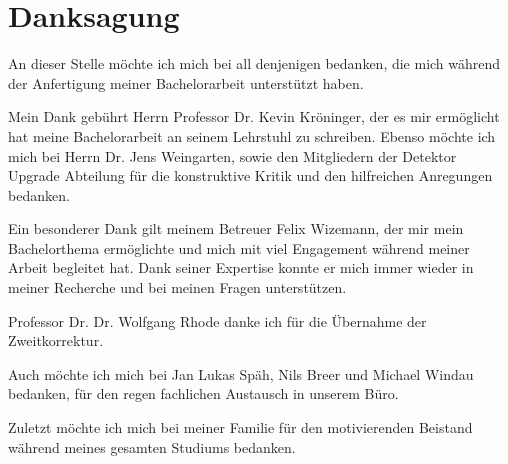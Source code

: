 \thispagestyle{empty}
\section*{Danksagung}

An dieser Stelle möchte ich mich bei all denjenigen bedanken, die mich während
der Anfertigung meiner Bachelorarbeit unterstützt haben.

Mein Dank gebührt Herrn Professor Dr. Kevin Kröninger, der es mir ermöglicht hat
meine Bachelorarbeit an seinem Lehrstuhl zu schreiben.
Ebenso möchte ich mich bei Herrn Dr. Jens Weingarten, sowie den Mitgliedern der
Detektor Upgrade Abteilung für die konstruktive Kritik und den hilfreichen Anregungen bedanken.

Ein besonderer Dank gilt meinem Betreuer Felix Wizemann, der mir
mein Bachelorthema ermöglichte und mich mit viel Engagement
während meiner Arbeit begleitet hat. Dank seiner Expertise konnte er mich immer wieder in meiner
Recherche und bei meinen Fragen unterstützen.

Professor Dr. Dr. Wolfgang Rhode danke ich für die Übernahme der Zweitkorrektur. 

Auch möchte ich mich bei Jan Lukas Späh, Nils Breer und Michael Windau bedanken, für
den regen fachlichen Austausch in unserem Büro.

Zuletzt möchte ich mich bei meiner Familie für den motivierenden Beistand
während meines gesamten Studiums bedanken.
